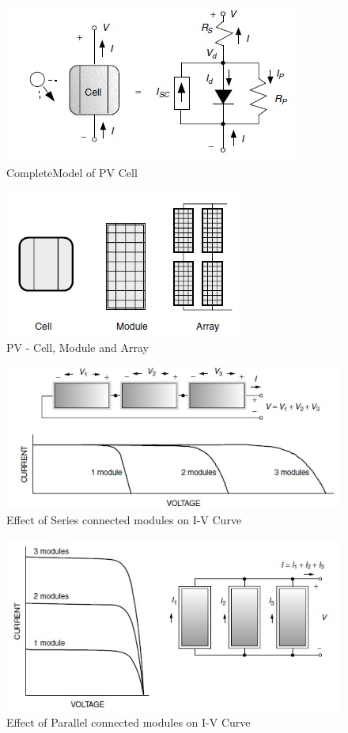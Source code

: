 \documentclass[12pt]{article}
\begin{document}
\begin{figure}[H]
\centering
\includegraphics[scale=0.5]{pv3}
\caption{CompleteModel of PV Cell}
\label{figc3h333} %
\end{figure}

\begin{figure}[H]
\centering
\includegraphics[scale=0.5]{pv4}
\caption{PV - Cell, Module and Array}
\label{figc3h444} %
\end{figure}

\begin{figure}[H]
\centering
\includegraphics[scale=0.5]{pv5}
\caption{Effect of Series connected modules on I-V Curve}
\label{figc3h555} %
\end{figure}

\begin{figure}[H]
\centering
\includegraphics[scale=0.5]{pv6}
\caption{Effect of Parallel connected modules on I-V Curve}
\label{figc3h666} %
\end{figure}
\end{document}
